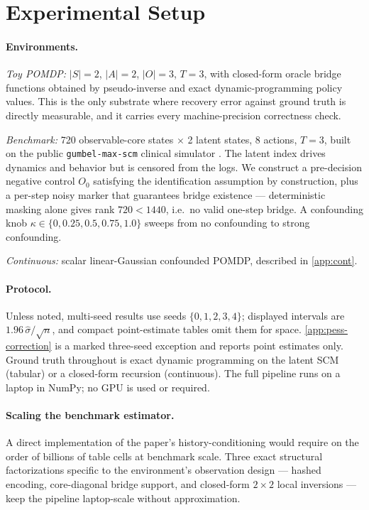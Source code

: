 \section{Experimental Setup}
\label{app:setup}

\paragraph{Environments.}
\emph{Toy POMDP:} $|S|{=}2$, $|A|{=}2$, $|O|{=}3$, $T{=}3$, with closed-form
oracle bridge functions obtained by pseudo-inverse and exact dynamic-programming
policy values. This is the only substrate where recovery error against ground
truth is directly measurable, and it carries every machine-precision correctness
check.

\emph{Benchmark:} 720 observable-core states $\times$ 2 latent states, 8 actions,
$T{=}3$, built on the public \texttt{gumbel-max-scm} clinical simulator
\citep{oberst2019}. The latent index drives dynamics and behavior but is censored
from the logs. We construct a pre-decision negative control $O_0$ satisfying the
identification assumption by construction, plus a per-step noisy marker that
guarantees bridge existence --- deterministic masking alone gives rank
$720 < 1440$, i.e.\ no valid one-step bridge. A confounding knob
$\kappa \in \{0, 0.25, 0.5, 0.75, 1.0\}$ sweeps from no confounding to strong
confounding.

\emph{Continuous:} scalar linear-Gaussian confounded POMDP, described in
\cref{app:cont}.

\paragraph{Protocol.} Unless noted, multi-seed results use seeds
$\{0,1,2,3,4\}$; displayed intervals are $1.96\,\hat\sigma/\sqrt{n}$, and compact
point-estimate tables omit them for space. \cref{app:pess-correction} is a marked
three-seed exception and reports point estimates only. Ground truth throughout is exact dynamic
programming on the latent SCM (tabular) or a closed-form recursion (continuous).
The full pipeline runs on a laptop in NumPy; no GPU is used or required.

\paragraph{Scaling the benchmark estimator.} A direct implementation of the
paper's history-conditioning would require on the order of billions of table
cells at benchmark scale. Three exact structural factorizations specific to the
environment's observation design --- hashed encoding, core-diagonal bridge
support, and closed-form $2\times2$ local inversions --- keep the pipeline
laptop-scale without approximation.


